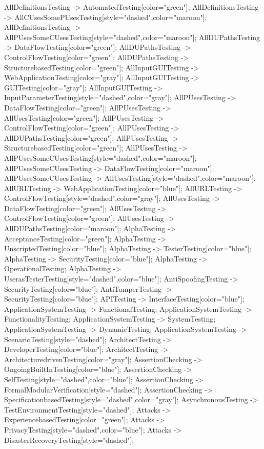 \documentclass{article}
\begin{document}
{AllDefinitionsTesting -> AutomatedTesting[color="green"];
AllDefinitionsTesting -> AllCUsesSomePUsesTesting[style="dashed",color="maroon"];
AllDefinitionsTesting -> AllPUsesSomeCUsesTesting[style="dashed",color="maroon"];
AllDUPathsTesting -> DataFlowTesting[color="green"];
AllDUPathsTesting -> ControlFlowTesting[color="green"];
AllDUPathsTesting -> StructurebasedTesting[color="green"];
AllInputGUITesting -> WebApplicationTesting[color="gray"];
AllInputGUITesting -> GUITesting[color="gray"];
AllInputGUITesting -> InputParameterTesting[style="dashed",color="gray"];
AllPUsesTesting -> DataFlowTesting[color="green"];
AllPUsesTesting -> AllUsesTesting[color="green"];
AllPUsesTesting -> ControlFlowTesting[color="green"];
AllPUsesTesting -> AllDUPathsTesting[color="green"];
AllPUsesTesting -> StructurebasedTesting[color="green"];
AllPUsesTesting -> AllPUsesSomeCUsesTesting[style="dashed",color="maroon"];
AllPUsesSomeCUsesTesting -> DataFlowTesting[color="maroon"];
AllPUsesSomeCUsesTesting -> AllUsesTesting[style="dashed",color="maroon"];
AllURLTesting -> WebApplicationTesting[color="blue"];
AllURLTesting -> ControlFlowTesting[style="dashed",color="gray"];
AllUsesTesting -> DataFlowTesting[color="green"];
AllUsesTesting -> ControlFlowTesting[color="green"];
AllUsesTesting -> AllDUPathsTesting[color="maroon"];
AlphaTesting -> AcceptanceTesting[color="green"];
AlphaTesting -> UnscriptedTesting[color="blue"];
AlphaTesting -> TesterTesting[color="blue"];
AlphaTesting -> SecurityTesting[color="blue"];
AlphaTesting -> OperationalTesting;
AlphaTesting -> UserasTesterTesting[style="dashed",color="blue"];
AntiSpoofingTesting -> SecurityTesting[color="blue"];
AntiTamperTesting -> SecurityTesting[color="blue"];
APITesting -> InterfaceTesting[color="blue"];
ApplicationSystemTesting -> FunctionalTesting;
ApplicationSystemTesting -> FunctionalityTesting;
ApplicationSystemTesting -> SystemTesting;
ApplicationSystemTesting -> DynamicTesting;
ApplicationSystemTesting -> ScenarioTesting[style="dashed"];
ArchitectTesting -> DeveloperTesting[color="blue"];
ArchitectTesting -> ArchitecturedrivenTesting[color="gray"];
AssertionChecking -> OngoingBuiltInTesting[color="blue"];
AssertionChecking -> SelfTesting[style="dashed",color="blue"];
AssertionChecking -> FormalModularVerification[style="dashed"];
AssertionChecking -> SpecificationbasedTesting[style="dashed",color="gray"];
AsynchronousTesting -> TestEnvironmentTesting[style="dashed"];
Attacks -> ExperiencebasedTesting[color="green"];
Attacks -> PrivacyTesting[style="dashed",color="blue"];
Attacks -> DisasterRecoveryTesting[style="dashed"];
}
\end{document}
